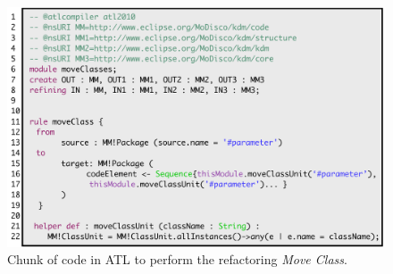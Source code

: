 


\begin{figure}[h]
	\centering
	\includegraphics[scale=0.47]{figuras/ATLTRansformationLanguage}
	\caption{Chunk of code in ATL to perform the refactoring \textit{Move Class}.}
	\label{fig:ATLRefactoring}
\end{figure}


